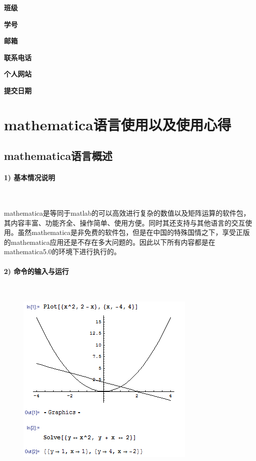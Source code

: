 \documentclass[UTF8]{ctexart}
\author{\Huge{易凯}}
\date{\Huge{\today}}
\begin{document}
	\maketitle
	\vspace{35mm}
	\begin{flushright}
	\Large{
  	\textbf{班级} 

  	\textbf{学号} 

  	\textbf{邮箱} 

  	\textbf{联系电话} 

  	\textbf{个人网站} 

  	\textbf{提交日期} \makebox[5em][l]{\today}
  	}
  	\end{flushright}
  	\newpage
  	\tableofcontents
	  \newpage

  \section{mathematica语言使用以及使用心得}
  \subsection{mathematica语言概述}
  \paragraph{1) 基本情况说明}

  ~

  mathematica是等同于matlab的可以高效进行复杂的数值以及矩阵运算的软件包，其内容丰富、功能齐全、操作简单、使用方便。同时其还支持与其他语言的交互使用。虽然mathematica是非免费的软件包，但是在中国的特殊国情之下，享受正版的mathematica应用还是不存在多大问题的。因此以下所有内容都是在mathematica5.0的环境下进行执行的。

  \paragraph{2) 命令的输入与运行}

  ~
  
  \begin{figure}[!htb]
  \centering
  \includegraphics[]{1.png}
  \end{figure}
\end{document}
